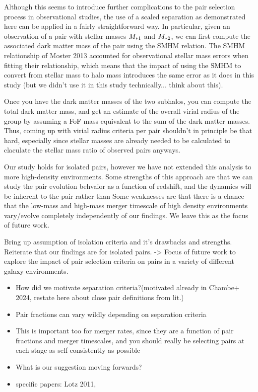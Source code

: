 \documentclass[twocolumn,linenumbers]{aastex631}
\begin{document}
    Although this seems to introduce further complications to the  pair selection process in observational studies, the use of a scaled separation as demonstrated here can be applied in a fairly straightforward way. 
    In particular, given an observation of a pair with stellar masses $M_{*{1}}$ and $M_{*{2}}$, we can first compute the associated dark matter mass of the pair using the SMHM relation. 
    The SMHM relationship of Moster 2013 accounted for observational stellar mass errors  when fitting their relationship, which means that the impact of using the SMHM to convert from stellar mass to halo mass introduces the same error as it does in this study (but we didn't use it in this study technically... think about this). 

    Once you have the dark matter masses of the two subhalos, you can compute the total dark matter mass, and get an estimate of the overall virial radius of the group by assuming a FoF mass equivalent to the sum of the dark matter masses. 
    Thus, coming up with virial radius criteria per pair shouldn't in principle be that hard, especially since stellar masses are already needed to be calculated to claculate the stellar mass ratio of observed pairs anyways. 


    Our study holds for isolated pairs, however we have not extended this analysis to more high-density environments. 
    Some strengths of this approach are that we can study the pair evolution behvaior as a function of redshift, and the dynamics will be inherent to the pair rather than 
    Some weaknesses are that there is a chance that the low-mass and high-mass merger timescale of high density environments vary/evolve completely independently of our findings. 
    We leave this as the focus of future work. 

      
    Bring up assumption of isolation criteria and it's drawbacks and strengths. Reiterate that our findings are for isolated pairs. -> Focus of future work to explore the impact of pair selection criteria on pairs in a variety of different galaxy environments. 
            \begin{itemize}
            \item How did we motivate separation criteria?(motivated already in Chambe+ 2024, restate here about close pair definitions from lit.)
            \item Pair fractions can vary wildly depending on separation criteria
            \item This is important too for merger rates, since they are a function of pair fractions and merger timescales, and you should really be selecting pairs at each stage as self-consistently as possible
            \item What is our suggestion moving forwards?
            \item specific papers: Lotz 2011, 
        \end{itemize}
\end{document}
